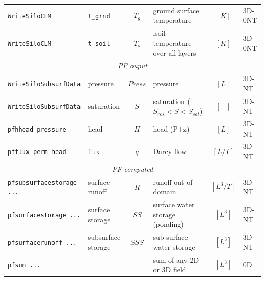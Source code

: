 \documentclass[11pt,a4paper]{report}
\begin{document}
\begin{landscape}
\begin{table}[htbp]
\begin{tabular}{llcp{7cm}cl}
\verb$WriteSiloCLM$&\verb$t_grnd$  & $T_g$   & ground surface temperature & $[K]$ &    3D-0NT \\
\verb$WriteSiloCLM$&\verb$t_soil$   & $T_s$  & lsoil temperature over all layers & $[K]$ &    3D-0NT \\
\multicolumn{6}{c}{\emph{PF ouput}}    \\
\verb$WriteSiloSubsurfData$&pressure   & $Press $  & pressure & $[L]$ &    3D-NT \\
\verb$WriteSiloSubsurfData$&saturation  & $S $  & saturation ($S_{res}<S<S_{sat}$) & $[-]$ &    3D-NT \\
\verb$pfhhead pressure$ &head &   $H$  & head (P+z) & $[L]$ &    3D-NT \\
\verb$pfflux perm head$ &flux &   $q$  & Darcy flow & $[L/T]$ &    3D-NT \\
\multicolumn{6}{c}{\emph{PF computed}}    \\
\verb$pfsubsurfacestorage ...$ &surface runoff   & $R $  & runoff out of domain & $[L^3/T]$ &    3D-NT \\
\verb$pfsurfacestorage ...$ &surface storage   & $SS $  & surface water storage (ponding) & $[L^3]$ &    3D-NT \\
\verb$pfsurfacerunoff ...$ &subsurface storage &   $SSS$  & sub-surface water storage & $[L^3]$ &    3D-NT \\
\verb$pfsum ...$ & &     & sum of any 2D or 3D field & $[L^3]$ &    0D\\
\bottomrule
\end{tabular}
\end{table}

\end{landscape}
\end{document}
